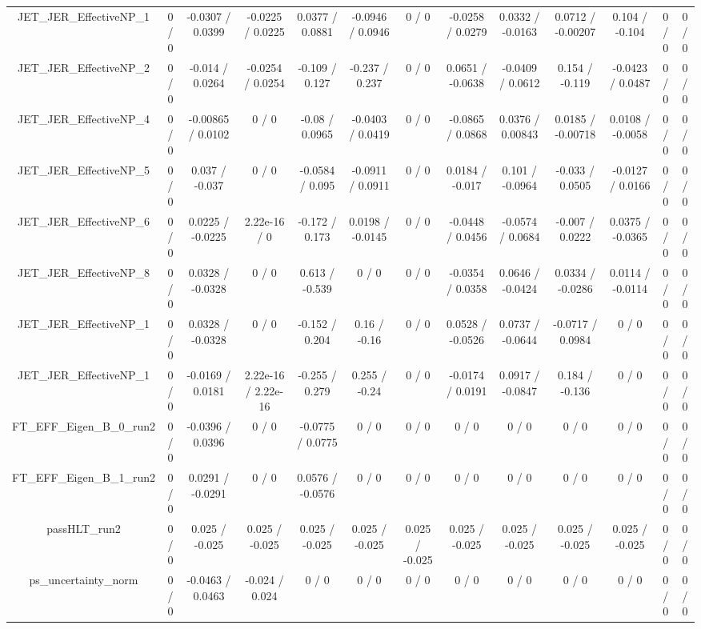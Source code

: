 \documentclass[10pt]{article}
\begin{document}
\begin{table}[htbp]
\begin{center}
\begin{tabular}{|c|c|c|c|c|c|c|c|c|c|c|c|c|}
  JET_JER_EffectiveNP_1 & 0 / 0 & -0.0307 / 0.0399 & -0.0225 / 0.0225 & 0.0377 / 0.0881 & -0.0946 / 0.0946 & 0 / 0 & -0.0258 / 0.0279 & 0.0332 / -0.0163 & 0.0712 / -0.00207 & 0.104 / -0.104 & 0 / 0 & 0 / 0 \\ 
  JET_JER_EffectiveNP_2 & 0 / 0 & -0.014 / 0.0264 & -0.0254 / 0.0254 & -0.109 / 0.127 & -0.237 / 0.237 & 0 / 0 & 0.0651 / -0.0638 & -0.0409 / 0.0612 & 0.154 / -0.119 & -0.0423 / 0.0487 & 0 / 0 & 0 / 0 \\ 
  JET_JER_EffectiveNP_4 & 0 / 0 & -0.00865 / 0.0102 & 0 / 0 & -0.08 / 0.0965 & -0.0403 / 0.0419 & 0 / 0 & -0.0865 / 0.0868 & 0.0376 / 0.00843 & 0.0185 / -0.00718 & 0.0108 / -0.0058 & 0 / 0 & 0 / 0 \\ 
  JET_JER_EffectiveNP_5 & 0 / 0 & 0.037 / -0.037 & 0 / 0 & -0.0584 / 0.095 & -0.0911 / 0.0911 & 0 / 0 & 0.0184 / -0.017 & 0.101 / -0.0964 & -0.033 / 0.0505 & -0.0127 / 0.0166 & 0 / 0 & 0 / 0 \\ 
  JET_JER_EffectiveNP_6 & 0 / 0 & 0.0225 / -0.0225 & 2.22e-16 / 0 & -0.172 / 0.173 & 0.0198 / -0.0145 & 0 / 0 & -0.0448 / 0.0456 & -0.0574 / 0.0684 & -0.007 / 0.0222 & 0.0375 / -0.0365 & 0 / 0 & 0 / 0 \\ 
  JET_JER_EffectiveNP_8 & 0 / 0 & 0.0328 / -0.0328 & 0 / 0 & 0.613 / -0.539 & 0 / 0 & 0 / 0 & -0.0354 / 0.0358 & 0.0646 / -0.0424 & 0.0334 / -0.0286 & 0.0114 / -0.0114 & 0 / 0 & 0 / 0 \\ 
  JET_JER_EffectiveNP_1 & 0 / 0 & 0.0328 / -0.0328 & 0 / 0 & -0.152 / 0.204 & 0.16 / -0.16 & 0 / 0 & 0.0528 / -0.0526 & 0.0737 / -0.0644 & -0.0717 / 0.0984 & 0 / 0 & 0 / 0 & 0 / 0 \\ 
  JET_JER_EffectiveNP_1 & 0 / 0 & -0.0169 / 0.0181 & 2.22e-16 / 2.22e-16 & -0.255 / 0.279 & 0.255 / -0.24 & 0 / 0 & -0.0174 / 0.0191 & 0.0917 / -0.0847 & 0.184 / -0.136 & 0 / 0 & 0 / 0 & 0 / 0 \\ 
  FT_EFF_Eigen_B_0_run2 & 0 / 0 & -0.0396 / 0.0396 & 0 / 0 & -0.0775 / 0.0775 & 0 / 0 & 0 / 0 & 0 / 0 & 0 / 0 & 0 / 0 & 0 / 0 & 0 / 0 & 0 / 0 \\ 
  FT_EFF_Eigen_B_1_run2 & 0 / 0 & 0.0291 / -0.0291 & 0 / 0 & 0.0576 / -0.0576 & 0 / 0 & 0 / 0 & 0 / 0 & 0 / 0 & 0 / 0 & 0 / 0 & 0 / 0 & 0 / 0 \\ 
  passHLT_run2 & 0 / 0 & 0.025 / -0.025 & 0.025 / -0.025 & 0.025 / -0.025 & 0.025 / -0.025 & 0.025 / -0.025 & 0.025 / -0.025 & 0.025 / -0.025 & 0.025 / -0.025 & 0.025 / -0.025 & 0 / 0 & 0 / 0 \\ 
  ps_uncertainty_norm & 0 / 0 & -0.0463 / 0.0463 & -0.024 / 0.024 & 0 / 0 & 0 / 0 & 0 / 0 & 0 / 0 & 0 / 0 & 0 / 0 & 0 / 0 & 0 / 0 & 0 / 0 \\ 

\end{tabular}
\end{center}
\end{table}
\end{document}
